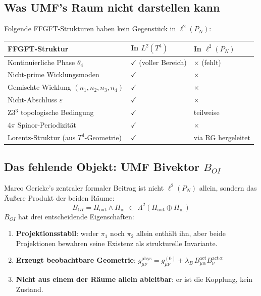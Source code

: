 \subsection{Was UMF's Raum nicht darstellen kann}

Folgende FFGFT-Strukturen haben kein Gegenstück in $\ell^2(P_N)$:

\begin{center}
\renewcommand{\arraystretch}{1.4}
{\small
\begin{tabular}{p{5cm}p{3.5cm}p{3.5cm}}
\toprule
\textbf{FFGFT-Struktur} & \textbf{In $L^2(T^4)$} & \textbf{In $\ell^2(P_N)$} \\
\midrule
Kontinuierliche Phase $\theta_4$ & $\checkmark$ (voller Bereich) & $\times$ (fehlt) \\
Nicht-prime Wicklungsmoden & $\checkmark$ & $\times$ \\
Gemischte Wicklung $(n_1,n_2,n_3,n_4)$ & $\checkmark$ & $\times$ \\
Nicht-Abschluss $\varepsilon$ & $\checkmark$ & $\times$ \\
Z3$^3$ topologische Bedingung & $\checkmark$ & teilweise \\
$4\pi$ Spinor-Periodizität & $\checkmark$ & $\times$ \\
Lorentz-Struktur (aus $T^4$-Geometrie) & $\checkmark$ & via RG hergeleitet \\
\bottomrule
\end{tabular}
}
\end{center}

\subsection{Das fehlende Objekt: UMF Bivektor \texorpdfstring{$B_{OI}$}{B\_OI}}
\label{sec:bivector}

Marco Gericke's zentraler formaler Beitrag ist nicht $\ell^2(P_N)$ allein,
sondern das Äußere Produkt der beiden Räume:
\begin{equation}
  B_{OI} = \Pi_\text{out} \wedge \Pi_\text{in}
  \;\in\; \Lambda^2(H_\text{out} \oplus H_\text{in})
  \tag{244.4b}
\end{equation}
$B_{OI}$ hat drei entscheidende Eigenschaften:
\begin{enumerate}
  \item \textbf{Projektionsstabil}: weder $\pi_1$ noch $\pi_2$ allein enthält ihn,
    aber beide Projektionen bewahren seine Existenz als strukturelle Invariante.
  \item \textbf{Erzeugt beobachtbare Geometrie}:
    $g_{\mu\nu}^\text{phys} = g_{\mu\nu}^{(0)} + \lambda_B\,
    B_{\mu\alpha}^\text{act} B_{\nu}^{\text{act}\,\alpha}$
  \item \textbf{Nicht aus einem der Räume allein ableitbar}: er ist die Kopplung,
    kein Zustand.
\end{enumerate}

